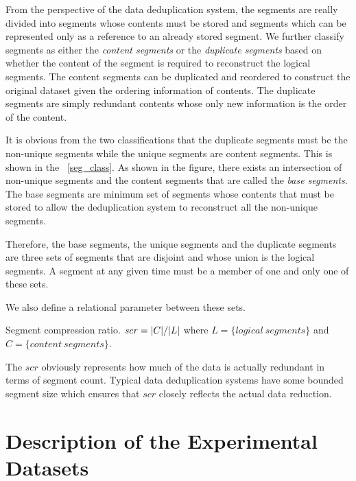 From the perspective of the data deduplication system, the segments are really divided into segments whose contents must be stored and segments which can be represented only as a reference to an already stored segment. We further classify segments as either the \emph{content segments} or the \emph{duplicate segments} based on whether the content of the segment is required to reconstruct the logical segments. The content segments can be duplicated and reordered to construct the original dataset given the ordering information of contents. The duplicate segments are simply redundant contents whose only new information is the order of the content.

It is obvious from the two classifications that the duplicate segments must be the non-unique segments while the unique segments are content segments. This is shown in the \figurename~\ref{seg_class}. As shown in the figure, there exists an intersection of non-unique segments and the content segments that are called the \emph{base segments}. The base segments are minimum set of segments whose contents that must be stored to allow the deduplication system to reconstruct all the non-unique segments.

Therefore, the base segments, the unique segments and the duplicate segments are three sets of segments that are disjoint and whose union is the logical segments. A segment at any given time must be a member of one and only one of these sets.

We also define a relational parameter between these sets.
\begin{definition}\label{scr}
Segment compression ratio. $\mathit{scr} = \lvert C\rvert/\lvert L\rvert$ where $L=\{\mathit{logical\ segments}\}$ and $C=\{\mathit{content\ segments}\}$. 
\end{definition}

The $\mathit{scr}$ obviously represents how much of the data is actually redundant in terms of segment count. Typical data deduplication systems have some bounded segment size which ensures that $\mathit{scr}$ closely reflects the actual data reduction. 

\section{Description of the Experimental Datasets}\label{dss}

